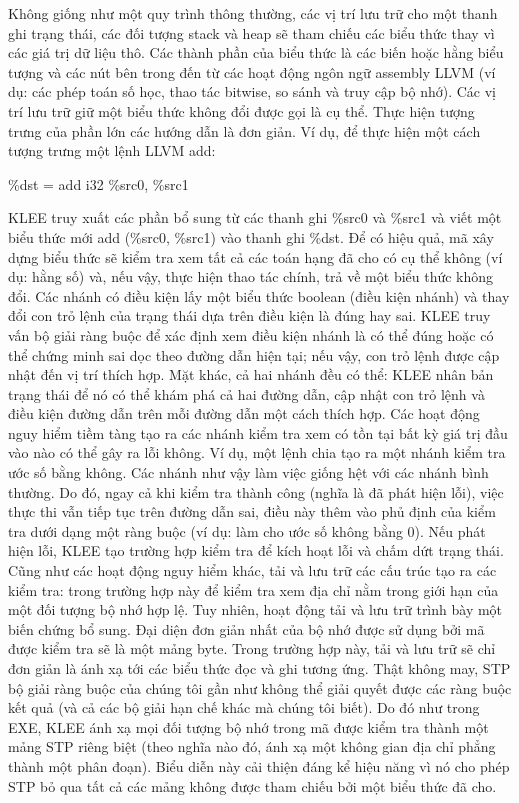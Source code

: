 \documentclass[12pt,a4paper]{article}
\begin{document}
\indent Không giống như một quy trình thông thường, các vị trí lưu trữ cho một thanh ghi trạng thái, các đối tượng stack và heap sẽ tham chiếu các biểu thức  thay vì các giá trị dữ liệu thô. Các thành phần của biểu thức là các biến hoặc hằng biểu tượng và các nút bên trong đến từ các hoạt động ngôn ngữ assembly LLVM (ví dụ: các phép toán số học, thao tác bitwise, so sánh và truy cập bộ nhớ). Các vị trí lưu trữ giữ một biểu thức không đổi được gọi là cụ thể.\newline
\indent Thực hiện tượng trưng của phần lớn các hướng dẫn là đơn giản. Ví dụ, để thực hiện một cách tượng trưng một lệnh LLVM add:
\begin{center}
\%dst = add i32 \%src0, \%src1
\end{center}
\indent KLEE truy xuất các phần bổ sung từ các thanh ghi \%src0 và \%src1 và viết một biểu thức mới add (\%src0, \%src1) vào thanh ghi \%dst. Để có hiệu quả, mã xây dựng biểu thức sẽ kiểm tra xem tất cả các toán hạng đã cho có cụ thể không (ví dụ: hằng số) và, nếu vậy, thực hiện thao tác chính, trả về một biểu thức không đổi.\newline
\indent Các nhánh có điều kiện lấy một biểu thức boolean (điều kiện nhánh) và thay đổi con trỏ lệnh của trạng thái dựa trên điều kiện là đúng hay sai. KLEE truy vấn bộ giải ràng buộc để xác định xem điều kiện nhánh là có thể đúng hoặc có thể chứng minh sai dọc theo đường dẫn hiện tại; nếu vậy, con trỏ lệnh được cập nhật đến vị trí thích hợp. Mặt khác, cả hai nhánh đều có thể: KLEE nhân bản trạng thái để nó có thể khám phá cả hai đường dẫn, cập nhật con trỏ lệnh và điều kiện đường dẫn trên mỗi đường dẫn một cách thích hợp.\newline
\indent Các hoạt động nguy hiểm tiềm tàng tạo ra các nhánh kiểm tra xem có tồn tại bất kỳ giá trị đầu vào nào có thể gây ra lỗi không. Ví dụ, một lệnh chia tạo ra một nhánh kiểm tra ước số bằng không. Các nhánh như vậy làm việc giống hệt với các nhánh bình thường. Do đó, ngay cả khi kiểm tra thành công (nghĩa là đã phát hiện lỗi), việc thực thi vẫn tiếp tục trên đường dẫn sai, điều này thêm vào phủ định của kiểm tra dưới dạng một ràng buộc (ví dụ: làm cho ước số không bằng 0). Nếu phát hiện lỗi, KLEE tạo trường hợp kiểm tra để kích hoạt lỗi và chấm dứt trạng thái.\newline
\indent Cũng như các hoạt động nguy hiểm khác, tải và lưu trữ các cấu trúc tạo ra các kiểm tra: trong trường hợp này để kiểm tra xem địa chỉ nằm trong giới hạn của một đối tượng bộ nhớ hợp lệ. Tuy nhiên, hoạt động tải và lưu trữ trình bày một biến chứng bổ sung. Đại diện đơn giản nhất của bộ nhớ được sử dụng bởi mã được kiểm tra sẽ là một mảng byte. Trong trường hợp này, tải và lưu trữ sẽ chỉ đơn giản là ánh xạ tới các biểu thức đọc và ghi tương ứng. Thật không may, STP bộ giải ràng buộc của chúng tôi gần như không thể giải quyết được các ràng buộc kết quả (và cả các bộ giải hạn chế khác mà chúng tôi biết). Do đó như trong EXE, KLEE ánh xạ mọi đối tượng bộ nhớ trong mã được kiểm tra thành một mảng STP riêng biệt (theo nghĩa nào đó, ánh xạ một không gian địa chỉ phẳng thành một phân đoạn). Biểu diễn này cải thiện đáng kể hiệu năng vì nó cho phép STP bỏ qua tất cả các mảng không được tham chiếu bởi một biểu thức đã cho. \newline
\end{document}
